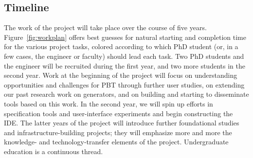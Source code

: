 \subsection*{Timeline}

The work of the project will take place over the course of five years.
Figure~\ref{fig:workplan} offers best guesses for natural starting and
completion time for the various project tasks, colored according to
which PhD student (or, in a few cases, the engineer or faculty) should
lead each task.
%
Two PhD students and the engineer will be recruited during the first
year, and two more students in the second year.  Work at the beginning
of the project will focus on understanding
opportunities and challenges for PBT through further user studies,
on extending
our past research work on generators, and on building and starting to
disseminate tools based on this work.  In the second year,
we will spin up efforts in specification tools and user-interface
experiments and begin constructing the \tyche{} IDE.  The latter years
of the project will introduce further foundational studies and
infrastructure-building projects; they will emphasize more and more the
knowledge- and technology-transfer elements of the project.
Undergraduate education is a continuous thread.





